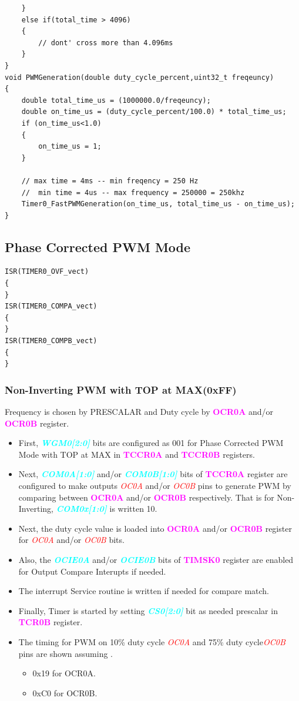 \documentclass{article}
\newcommand{\bitFormat}[1]{\emph{\textbf{\textcolor{cyan}{#1}}}}
\newcommand{\regFormat}[1]{\textbf{\textcolor{magenta}{#1}}}
\newcommand{\pinFormat}[1]{\emph{\textcolor{red}{#1}}}
\begin{document}
\begin{verbatim}
	}
	else if(total_time > 4096)
	{
		// dont' cross more than 4.096ms
	}
}
void PWMGeneration(double duty_cycle_percent,uint32_t freqeuncy)
{
	double total_time_us = (1000000.0/freqeuncy);	
	double on_time_us = (duty_cycle_percent/100.0) * total_time_us;
	if (on_time_us<1.0)
	{
		on_time_us = 1;
	}
	
	// max time = 4ms -- min freqency = 250 Hz
	//  min time = 4us -- max frequency = 250000 = 250khz
	Timer0_FastPWMGeneration(on_time_us, total_time_us - on_time_us);
}
\end{verbatim}


\subsection{Phase Corrected PWM Mode}
\begin{verbatim}
ISR(TIMER0_OVF_vect)
{
} 
ISR(TIMER0_COMPA_vect)
{
}
ISR(TIMER0_COMPB_vect)
{
}
\end{verbatim}
\subsubsection{Non-Inverting PWM with TOP at MAX(0xFF)}
\quad Frequency is chosen by PRESCALAR and Duty cycle by \regFormat{OCR0A} and/or \regFormat{OCR0B} register.
\begin{itemize}
    \item First, \bitFormat{WGM0[2:0]} bits are configured as 001 for Phase Corrected PWM Mode with TOP at MAX in \regFormat{TCCR0A} and \regFormat{TCCR0B} registers.
    \item Next, \bitFormat{COM0A[1:0]} and/or \bitFormat{COM0B[1:0]} bits of \regFormat{TCCR0A} register are configured to make outputs \pinFormat{OC0A} and/or \pinFormat{OC0B} pins to generate PWM by comparing between \regFormat{OCR0A} and/or \regFormat{OCR0B} respectively. That is for Non-Inverting, \bitFormat{COM0x[1:0]} is written 10.
    \item Next, the duty cycle value is loaded into \regFormat{OCR0A} and/or \regFormat{OCR0B} register for \pinFormat{OC0A} and/or \pinFormat{OC0B} bits.
    \item Also, the \bitFormat{OCIE0A} and/or \bitFormat{OCIE0B} bits of \regFormat{TIMSK0} register  are enabled for Output Compare Interupts if needed.
    \item The interrupt Service routine is written if needed for compare match.
    \item Finally, Timer is started by setting \bitFormat{CS0[2:0]} bit as needed prescalar in \regFormat{TCR0B} register.
    \item The timing for PWM on 10\% duty cycle \pinFormat{OC0A} and 75\% duty cycle\pinFormat{OC0B} pins are shown assuming .
    \begin{itemize}
        \item 0x19 for OCR0A.
        \item 0xC0 for OCR0B.
    \end{itemize}
\end{itemize}
\end{document}
